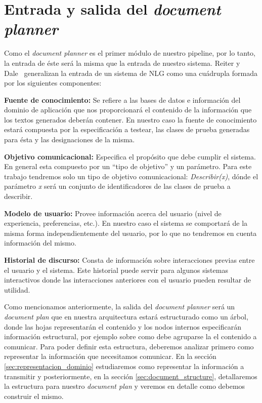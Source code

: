 \section{Entrada y salida del \textit{document planner}}
Como el \textit{document planner} es el primer módulo de nuestro pipeline, por lo tanto, la entrada de éste será la misma que la entrada de nuestro sistema. Reiter y Dale~\cite{reiter_dale} generalizan la entrada de un sistema de NLG  como una cuádrupla formada por los siguientes componentes:

\bigskip
\noindent
\textbf{Fuente de conocimiento:} Se refiere a las bases de datos e información del dominio de aplicación que nos proporcionará el contenido de la información que los textos generados deberán contener.
En nuestro caso la fuente de conocimiento estará compuesta por la especificación a testear, las clases de prueba generadas para ésta y las designaciones de la misma. 

\bigskip
\noindent
\textbf{Objetivo comunicacional:} Especifica el propósito que debe cumplir el sistema. En general esta compuesto por un ``tipo de objetivo'' y un parámetro.
Para este trabajo tendremos solo un tipo de objetivo comunicacional: \emph{Describir(x)}, dónde el parámetro \emph{x} será un conjunto de identificadores de las clases de prueba a describir.

\bigskip
\noindent
\textbf{Modelo de usuario:} Provee información acerca del usuario (nivel de experiencia, preferencias, etc.). En nuestro caso el sistema se comportará de la misma forma independientemente del usuario, por lo que no tendremos en cuenta información del mismo.

\bigskip
\noindent
\textbf{Historial de discurso:} Consta de información sobre interacciones previas entre el usuario y el sistema. Este historial puede servir para algunos sistemas interactivos donde las interacciones anteriores con el usuario pueden resultar de utilidad. 

\bigskip
Como mencionamos anteriormente, la salida del \textit{document planner} será un \textit{document plan} que en nuestra arquitectura estará estructurado como un árbol, donde las hojas representarán el contenido y los nodos internos especificarán información estructural, por ejemplo sobre como debe agruparse la el contenido a comunicar. Para poder definir esta estructura, deberemos analizar primero como representar la información que necesitamos comunicar. En la sección \ref{sec:representacion_dominio} estudiaremos como representar la información a transmitir y posteriormente, en la sección \ref{sec:document_structure}, detallaremos la estructura para nuestro \emph{document plan} y veremos en detalle como debemos construir el mismo.

